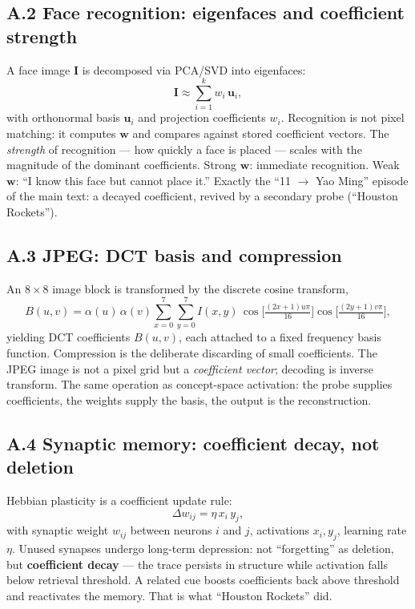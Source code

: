 \documentclass[12pt, a4paper]{article}
\begin{document}
\subsection*{A.2 Face recognition: eigenfaces and coefficient strength}
A face image $\mathbf{I}$ is decomposed via PCA/SVD into eigenfaces:
\begin{equation}
\mathbf{I} \approx \sum_{i=1}^{k} w_i\, \mathbf{u}_i ,
\end{equation}
with orthonormal basis $\mathbf{u}_i$ and projection coefficients $w_i$. Recognition is not pixel matching: it computes $\mathbf{w}$ and compares against stored coefficient vectors. The \emph{strength} of recognition --- how quickly a face is placed --- scales with the magnitude of the dominant coefficients. Strong $\mathbf{w}$: immediate recognition. Weak $\mathbf{w}$: ``I know this face but cannot place it.'' Exactly the ``11 $\to$ Yao Ming'' episode of the main text: a decayed coefficient, revived by a secondary probe (``Houston Rockets'').

\subsection*{A.3 JPEG: DCT basis and compression}
An $8{\times}8$ image block is transformed by the discrete cosine transform,
\begin{equation}
B(u,v) = \alpha(u)\,\alpha(v) \sum_{x=0}^{7}\sum_{y=0}^{7} I(x,y)\, \cos\!\Big[\tfrac{(2x+1)u\pi}{16}\Big] \cos\!\Big[\tfrac{(2y+1)v\pi}{16}\Big] ,
\end{equation}
yielding DCT coefficients $B(u,v)$, each attached to a fixed frequency basis function. Compression is the deliberate discarding of small coefficients. The JPEG image is not a pixel grid but a \emph{coefficient vector}; decoding is inverse transform. The same operation as concept-space activation: the probe supplies coefficients, the weights supply the basis, the output is the reconstruction.

\subsection*{A.4 Synaptic memory: coefficient decay, not deletion}
Hebbian plasticity is a coefficient update rule:
\begin{equation}
\Delta w_{ij} = \eta\, x_i\, y_j ,
\end{equation}
with synaptic weight $w_{ij}$ between neurons $i$ and $j$, activations $x_i, y_j$, learning rate $\eta$. Unused synapses undergo long-term depression: not ``forgetting'' as deletion, but \textbf{coefficient decay} --- the trace persists in structure while activation falls below retrieval threshold. A related cue boosts coefficients back above threshold and reactivates the memory. That is what ``Houston Rockets'' did.
\end{document}
